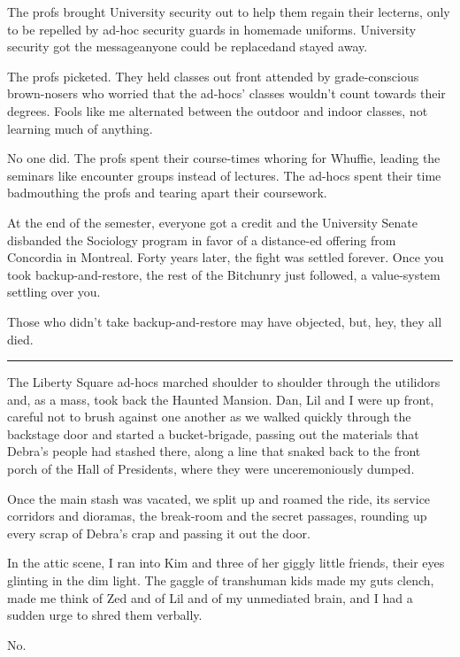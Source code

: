 The profs brought University security out to help them regain their
lecterns, only to be repelled by ad-hoc security guards in homemade
uniforms. University security got the message{\dash}anyone could be
replaced{\dash}and stayed away.

The profs picketed. They held classes out front attended by
grade-conscious brown-nosers who worried that the ad-hocs' classes
wouldn't count towards their degrees. Fools like me alternated
between the outdoor and indoor classes, not learning much of
anything.

No one did. The profs spent their course-times whoring for Whuffie,
leading the seminars like encounter groups instead of lectures. The
ad-hocs spent their time badmouthing the profs and tearing apart
their coursework.

At the end of the semester, everyone got a credit and the
University Senate disbanded the Sociology program in favor of a
distance-ed offering from Concordia in Montreal. Forty years later,
the fight was settled forever. Once you took backup-and-restore,
the rest of the Bitchunry just followed, a value-system settling
over you.

Those who didn't take backup-and-restore may have objected, but,
hey, they all died.

\begin{center}\rule{1in}{0.4pt}\end{center}

The Liberty Square ad-hocs marched shoulder to shoulder through the
utilidors and, as a mass, took back the Haunted Mansion. Dan, Lil
and I were up front, careful not to brush against one another as we
walked quickly through the backstage door and started a
bucket-brigade, passing out the materials that Debra's people had
stashed there, along a line that snaked back to the front porch of
the Hall of Presidents, where they were unceremoniously dumped.

Once the main stash was vacated, we split up and roamed the ride,
its service corridors and dioramas, the break-room and the secret
passages, rounding up every scrap of Debra's crap and passing it
out the door.

In the attic scene, I ran into Kim and three of her giggly little
friends, their eyes glinting in the dim light. The gaggle of
transhuman kids made my guts clench, made me think of Zed and of
Lil and of my unmediated brain, and I had a sudden urge to shred
them verbally.

No.

